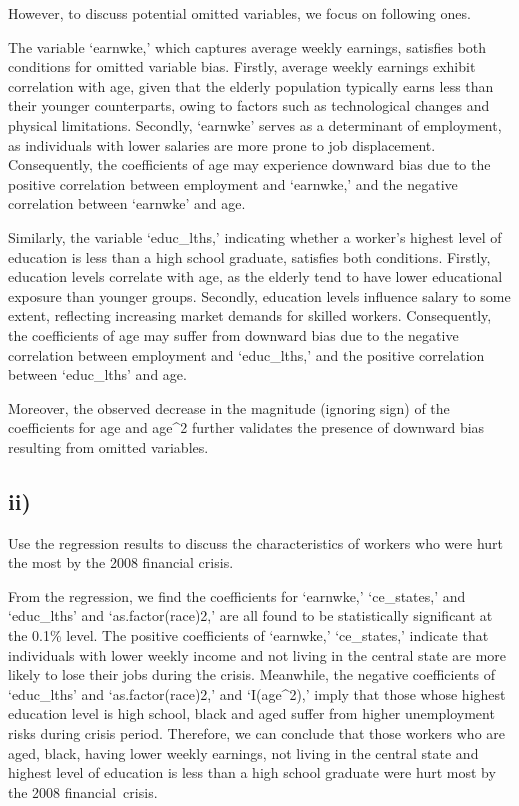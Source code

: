 \documentclass[
]{article}
\begin{document}
However, to discuss potential omitted variables, we focus on following
ones.

The variable `earnwke,' which captures average weekly earnings,
satisfies both conditions for omitted variable bias. Firstly, average
weekly earnings exhibit correlation with age, given that the elderly
population typically earns less than their younger counterparts, owing
to factors such as technological changes and physical limitations.
Secondly, `earnwke' serves as a determinant of employment, as
individuals with lower salaries are more prone to job displacement.
Consequently, the coefficients of age may experience downward bias due
to the positive correlation between employment and `earnwke,' and the
negative correlation between `earnwke' and age.

Similarly, the variable `educ\_lths,' indicating whether a worker's
highest level of education is less than a high school graduate,
satisfies both conditions. Firstly, education levels correlate with age,
as the elderly tend to have lower educational exposure than younger
groups. Secondly, education levels influence salary to some extent,
reflecting increasing market demands for skilled workers. Consequently,
the coefficients of age may suffer from downward bias due to the
negative correlation between employment and `educ\_lths,' and the
positive correlation between `educ\_lths' and age.

Moreover, the observed decrease in the magnitude (ignoring sign) of the
coefficients for age and age\^{}2 further validates the presence of
downward bias resulting from omitted variables.

\hypertarget{ii-3}{%
\subsection{ii)}\label{ii-3}}

Use the regression results to discuss the characteristics of workers who
were hurt the most by the 2008 financial crisis. \vspace{1em}

From the regression, we find the coefficients for `earnwke,'
`ce\_states,' and `educ\_lths' and `as.factor(race)2,' are all found to
be statistically significant at the 0.1\% level. The positive
coefficients of `earnwke,' `ce\_states,' indicate that individuals with
lower weekly income and not living in the central state are more likely
to lose their jobs during the crisis. Meanwhile, the negative
coefficients of `educ\_lths' and `as.factor(race)2,' and `I(age\^{}2),'
imply that those whose highest education level is high school, black and
aged suffer from higher unemployment risks during crisis period.
Therefore, we can conclude that those workers who are aged, black,
having lower weekly earnings, not living in the central state and
highest level of education is less than a high school graduate were hurt
most by the 2008 financial~crisis.
\end{document}
